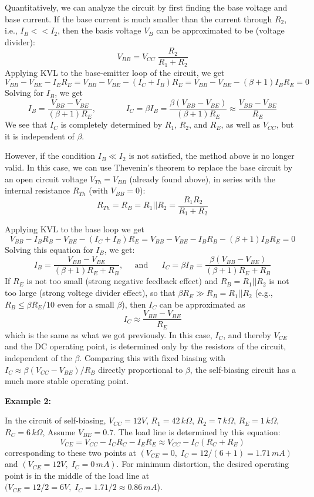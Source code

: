 \begin{itemize}
Quantitatively, we can analyze the circuit by first finding the base voltage 
and base current. If the base current is much smaller than the current through 
$R_2$, i.e., $I_B<<I_2$, then the basis voltage $V_B$ can be approximated 
to be (voltage divider):
\[
V_{BB}=V_{CC} \;\frac{R_2}{R_1+R_2}	
\]
Applying KVL to the base-emitter loop of the circuit, we get
\[
V_{BB}-V_{BE}-I_ER_E=V_{BB}-V_{BE}-(I_C+I_B)R_E=V_{BB}-V_{BE}-(\beta+1)I_BR_E=0 
\]
Solving for $I_B$, we get
\[ 
I_B=\frac{V_{BB}-V_{BE}}{(\beta+1)R_E},\;\;\;\;\;\;\;\;\;\;\;\;\;
I_C=\beta I_B=\frac{\beta(V_{BB}-V_{BE})}{(\beta+1)R_E}
\approx \frac{V_{BB}-V_{BE}}{R_E} 
\]
We see that $I_C$ is completely determined by $R_1$, $R_2$, and $R_E$, 
as well as $V_{CC}$, but it is independent of $\beta$.

However, if the condition $I_B \ll I_2$ is not satisfied, the method above 
is no longer valid. In this case, we can use Thevenin's theorem to replace 
the base circuit by an open circuit voltage $V_{Th}=V_{BB}$ (already found 
above), in series with the internal resistance $R_{Th}$ (with $V_{BB}=0$):
\[
R_{Th}=R_B=R_1||R_2=\frac{R_1R_2}{R_1+R_2}	
\]


Applying KVL to the base loop we get 
\[
V_{BB}-I_BR_B-V_{BE}-(I_C+I_B)R_E=V_{BB}-V_{BE}-I_BR_B-(\beta+1)I_BR_E=0 
\]
Solving this equation for $I_B$, we get:
\[
I_B=\frac{V_{BB}-V_{BE}}{(\beta+1) R_E+R_B},\;\;\;\;\;\mbox{and}\;\;\;\;\;\;
I_C =\beta I_B=\frac{\beta(V_{BB}-V_{BE})}{(\beta+1) R_E+R_B} 
\]
If $R_E$ is not too small (strong negative feedback effect) and $R_B=R_1||R_2$
is not too large (strong voltege divider effect), so that $\beta 
R_E \gg R_B=R_1||R_2$ (e.g., $R_B \le \beta R_E/10$ even for a small $\beta$), 
then $I_C$ can be approximated as
\[
I_C \approx \frac{V_{BB}-V_{BE}}{R_E} 
\]
which is the same as what we got previously. In this case, $I_C$, and thereby 
$V_{CE}$ and the DC operating point, is determined only by the resistors of 
the circuit, independent of the $\beta$. Comparing this with fixed biasing 
with $I_C \approx \beta (V_{CC}-V_{BE})/R_B$ directly 
proportional to $\beta$, the self-biasing circuit has a much more stable 
operating point.

{\bf Example 2:} 

In the circuit of self-biasing, $V_{CC}=12V$, $R_1=42\,k\Omega$, 
$R_2=7\,k\Omega$, $R_E=1\,k\Omega$, $R_C=6\,k\Omega$, Assume $V_{BE}=0.7$.  
The load line is determined by this equation:
\[
V_{CE}=V_{CC}-I_CR_C-I_ER_E\approx V_{CC}-I_C(R_C+R_E)
\]
corresponding to these two points at $(V_{CE}=0,\;I_C=12/(6+1)=1.71\,mA)$
and $(V_{CE}=12V,\;I_C=0\,mA)$. For minimum distortion, the desired 
operating point is in the middle of the load line at 
$(V_{CE}=12/2=6V,\;I_C=1.71/2\approx 0.86\,mA$).


\end{itemize}
